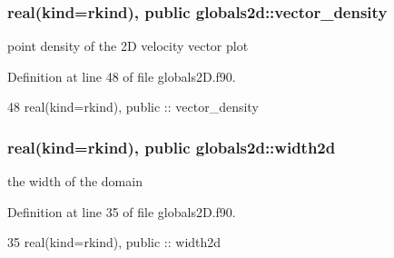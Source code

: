 \subsubsection[{vector\+\_\+density}]{\setlength{\rightskip}{0pt plus 5cm}real(kind=rkind), public globals2d\+::vector\+\_\+density}\label{namespaceglobals2d_ae5b94b87fe51452408dfc5f2668fee13}


point density of the 2D velocity vector plot 



Definition at line 48 of file globals2\+D.\+f90.


\begin{DoxyCode}
48   \textcolor{keywordtype}{real(kind=rkind)}, \textcolor{keywordtype}{public} :: vector_density
\end{DoxyCode}
\subsubsection[{width2d}]{\setlength{\rightskip}{0pt plus 5cm}real(kind=rkind), public globals2d\+::width2d}\label{namespaceglobals2d_a58558d6650ff9d7100c368ded59cdac8}


the width of the domain 



Definition at line 35 of file globals2\+D.\+f90.


\begin{DoxyCode}
35   \textcolor{keywordtype}{real(kind=rkind)}, \textcolor{keywordtype}{public} :: width2d
\end{DoxyCode}
